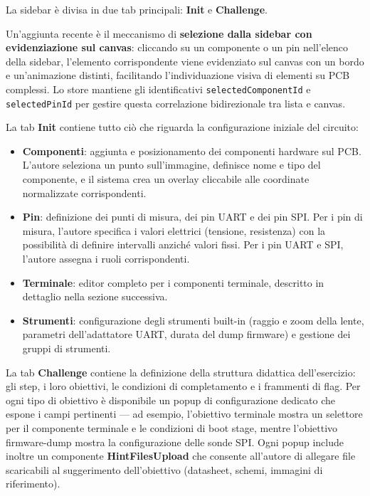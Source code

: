
La sidebar è divisa in due tab principali: \textbf{Init} e \textbf{Challenge}.

Un'aggiunta recente è il meccanismo di \textbf{selezione dalla sidebar con evidenziazione sul canvas}: cliccando su un componente o un pin nell'elenco della sidebar, l'elemento corrispondente viene evidenziato sul canvas con un bordo e un'animazione distinti, facilitando l'individuazione visiva di elementi su PCB complessi. Lo store mantiene gli identificativi \texttt{selectedComponentId} e \texttt{selectedPinId} per gestire questa correlazione bidirezionale tra lista e canvas.

La tab \textbf{Init} contiene tutto ciò che riguarda la configurazione iniziale del circuito:

\begin{itemize}
    \item \textbf{Componenti}: aggiunta e posizionamento dei componenti hardware sul PCB. L'autore seleziona un punto sull'immagine, definisce nome e tipo del componente, e il sistema crea un overlay cliccabile alle coordinate normalizzate corrispondenti.

    \item \textbf{Pin}: definizione dei punti di misura, dei pin UART e dei pin SPI. Per i pin di misura, l'autore specifica i valori elettrici (tensione, resistenza) con la possibilità di definire intervalli anziché valori fissi. Per i pin UART e SPI, l'autore assegna i ruoli corrispondenti.

    \item \textbf{Terminale}: editor completo per i componenti terminale, descritto in dettaglio nella sezione successiva.

    \item \textbf{Strumenti}: configurazione degli strumenti built-in (raggio e zoom della lente, parametri dell'adattatore UART, durata del dump firmware) e gestione dei gruppi di strumenti.
\end{itemize}

La tab \textbf{Challenge} contiene la definizione della struttura didattica dell'esercizio: gli step, i loro obiettivi, le condizioni di completamento e i frammenti di flag. Per ogni tipo di obiettivo è disponibile un popup di configurazione dedicato che espone i campi pertinenti --- ad esempio, l'obiettivo terminale mostra un selettore per il componente terminale e le condizioni di boot stage, mentre l'obiettivo firmware-dump mostra la configurazione delle sonde SPI. Ogni popup include inoltre un componente \textbf{HintFilesUpload} che consente all'autore di allegare file scaricabili al suggerimento dell'obiettivo (datasheet, schemi, immagini di riferimento).

